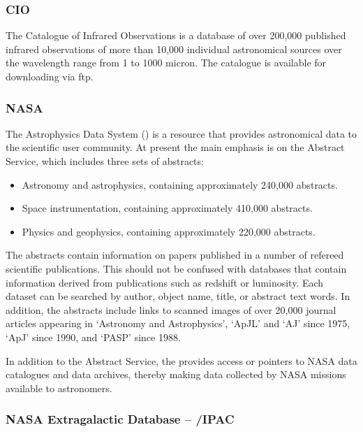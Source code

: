 \subsubsection{CIO} 
\label{sec:cio}
 
The Catalogue of Infrared Observations is a database of over 200,000
published infrared observations of more than 10,000 individual astronomical
sources over the wavelength range from 1 to 1000 micron. The catalogue is
available for downloading via ftp. 

\subsubsection{NASA {\ADSref}} 
\label{sec:ads}
 
The Astrophysics Data System ({\ADSref}) is a resource that provides
astronomical data to the scientific user community. At present the main
emphasis is on the Abstract Service, which includes three sets of abstracts: 

\begin{itemize}
\item Astronomy and astrophysics, containing approximately 240,000 abstracts. 
\item Space instrumentation, containing approximately 410,000 abstracts.
\item Physics and geophysics, containing approximately 220,000 abstracts. 
\end{itemize}

The abstracts contain information on papers published in a number of refereed
scientific publications. This should not be confused with databases that contain 
information derived from publications such as redshift or luminosity.
Each dataset can be searched by author, object name, title, or abstract text
words. In addition, the abstracts include links to scanned images of over
20,000 journal articles appearing in `Astronomy and Astrophysics',
 `ApJL' and `AJ' since 1975, `ApJ'
since 1990, and `PASP' since 1988. 

In addition to the Abstract Service, the {\ADSref} provides access or pointers to
NASA data catalogues and data archives, thereby making data collected by NASA
missions available to astronomers. 

\subsubsection{NASA Extragalactic Database -- {\NEDref}/IPAC} 
\label{sec:ned}

